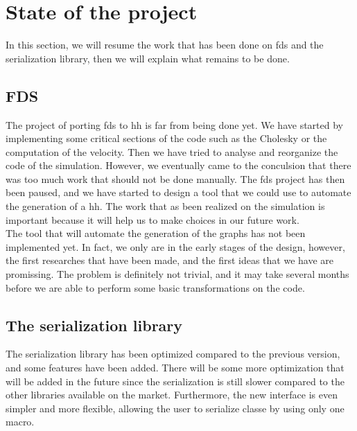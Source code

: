 
\section{State of the project}

In this section, we will resume the work that has been done on \gls{fds} and the
serialization library, then we will explain what remains to be done.

\subsection{FDS}

The project of porting \gls{fds} to \gls{hh} is far from being done yet. We have
started by implementing some critical sections of the code such as the Cholesky
or the computation of the velocity. Then we have tried to analyse and reorganize
the code of the simulation. However, we eventually came to the conculsion that
there was too much work that should not be done manually. The \gls{fds} project
has then been paused, and we have started to design a tool that we could use to
automate the generation of a \gls{hh}. The work that as been realized on the
simulation is important because it will help us to make choices in our future
work.\\

The tool that will automate the generation of the graphs has not been
implemented yet. In fact, we only are in the early stages of the design,
however, the first researches that have been made, and the first ideas that we
have are promissing. The problem is definitely not trivial, and it may take
several months before we are able to perform some basic transformations on the
code.

\subsection{The serialization library}

The serialization library has been optimized compared to the previous version,
and some features have been added. There will be some more optimization that
will be added in the future since the serialization is still slower compared to
the other libraries available on the market. Furthermore, the new interface is
even simpler and more flexible, allowing the user to serialize classe by using
only one macro.
